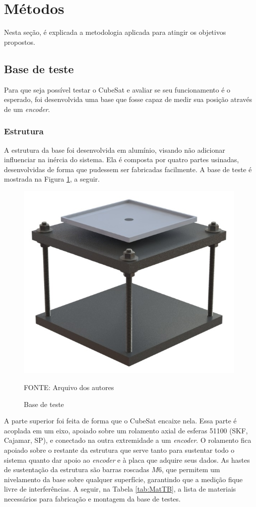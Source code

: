 \documentclass[
	12pt,				%
	openany,			%
	twoside,			%
	a4paper,			%
	english,			%
	french,				%
	spanish,			%
	brazil,				%
	oldfontcommands
	]{abntex2}
\begin{document}
\section[Métodos]{Métodos}

Nesta seção, é explicada a metodologia aplicada para atingir os objetivos propostos.

\subsection{Base de teste}

Para que seja possível testar o CubeSat e avaliar se seu funcionamento é o esperado, foi desenvolvida uma base que fosse capaz de medir sua posição através de um \textit{encoder}.

\subsubsection{Estrutura}

A estrutura da base foi desenvolvida em alumínio, visando não adicionar influenciar na inércia do sistema. Ela é composta por quatro partes usinadas, desenvolvidas de forma que pudessem ser fabricadas facilmente. A base de teste é mostrada na Figura \ref{fig:ProtoTB}, a seguir.

\begin{figure}[th]
	\caption{Base de teste}
	\centering
	\includegraphics[width=0.7\linewidth]{./figs/Test_Base}
	
	\begin{small}
		FONTE: Arquivo dos autores
	\end{small}
	\label{fig:ProtoTB}
\end{figure}

A parte superior foi feita de forma que o CubeSat encaixe nela. Essa parte é acoplada em um eixo, apoiado sobre um rolamento axial de esferas 51100 (SKF, Cajamar, SP), e conectado na outra extremidade a um \textit{encoder}. O rolamento fica apoiado sobre o restante da estrutura que serve tanto para sustentar todo o sistema quanto dar apoio ao \textit{encoder} e à placa que adquire seus dados. As hastes de sustentação da estrutura são barras roscadas $M6$, que permitem um nivelamento da base sobre qualquer superfície, garantindo que a medição fique livre de interferências. A seguir, na Tabela \ref{tab:MatTB}, a lista de materiais necessários para fabricação e montagem da base de testes.
\end{document}
